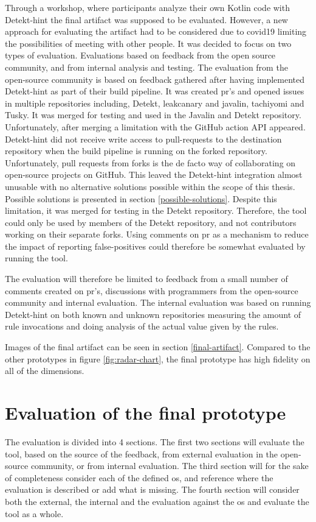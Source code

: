 \documentclass{report}
\begin{document}
Through a workshop, where participants analyze their own Kotlin code with Detekt-hint the final artifact was supposed to be evaluated. However, a new approach for evaluating the artifact had to be considered due to \gls{covid19} limiting the possibilities of meeting with other people. It was decided to focus on two types of evaluation. Evaluations based on feedback from the open source community, and from internal analysis and testing. The evaluation from the open-source community is based on feedback gathered after having implemented Detekt-hint as part of their build pipeline. It was created \gls{pr}'s and opened issues in multiple repositories including, Detekt\cite{detekt}, leakcanary\cite{leakcanary} and javalin\cite{javalin}, tachiyomi\cite{tachiyomi} and Tusky\cite{tusky}. It was merged for testing and used in the Javalin and Detekt repository. Unfortunately, after merging a limitation with the GitHub action API appeared. Detekt-hint did not receive write access to pull-requests to the destination repository when the build pipeline is running on the forked repository. Unfortunately, pull requests from forks is the de facto way of collaborating on open-source projects on GitHub. This leaved the Detekt-hint integration almost unusable with no alternative solutions possible within the scope of this thesis. Possible solutions is presented in section \ref{possible-solutions}. Despite this limitation, it was merged for testing in the Detekt repository. Therefore, the tool could only be used by members of the Detekt repository, and not contributors working on their separate forks. Using comments on \gls{pr} as a mechanism to reduce the impact of reporting false-positives could therefore be somewhat evaluated by running the tool.

The evaluation will therefore be limited to feedback from a small number of comments created on \gls{pr}'s, discussions with programmers from the open-source community and internal evaluation. The internal evaluation was based on running Detekt-hint on both known and unknown repositories measuring the amount of rule invocations and doing analysis of the actual value given by the rules. 

Images of the final artifact can be seen in section \ref{final-artifact}. Compared to the other prototypes in figure \ref{fig:radar-chart}, the final prototype has high fidelity on all of the dimensions. 


\section{Evaluation of the final prototype}
The evaluation is divided into 4 sections. The first two sections will evaluate the tool, based on the source of the feedback, from external evaluation in the open-source community, or from internal evaluation. The third section will for the sake of completeness consider each of the defined \gls{os}, and reference where the evaluation is described or add what is missing.  The fourth section will consider both the external, the internal and the evaluation against the \gls{os} and evaluate the tool as a whole. 
\end{document}

